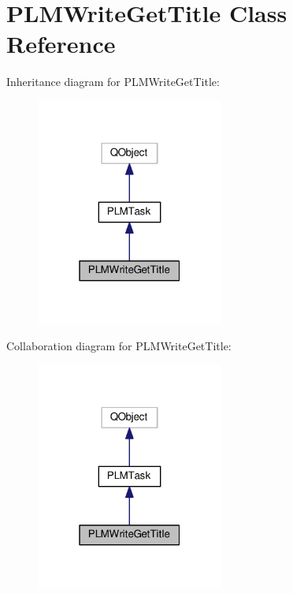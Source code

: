 \hypertarget{class_p_l_m_write_get_title}{}\section{P\+L\+M\+Write\+Get\+Title Class Reference}
\label{class_p_l_m_write_get_title}


Inheritance diagram for P\+L\+M\+Write\+Get\+Title\+:\nopagebreak
\begin{figure}[H]
\begin{center}
\leavevmode
\includegraphics[width=175pt]{class_p_l_m_write_get_title__inherit__graph}
\end{center}
\end{figure}


Collaboration diagram for P\+L\+M\+Write\+Get\+Title\+:\nopagebreak
\begin{figure}[H]
\begin{center}
\leavevmode
\includegraphics[width=175pt]{class_p_l_m_write_get_title__coll__graph}
\end{center}
\end{figure}
